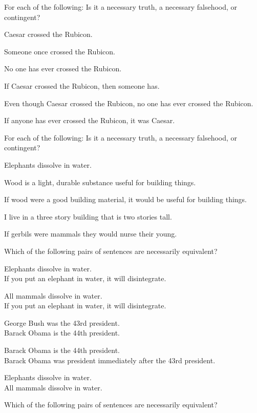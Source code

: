 \begin{practiceproblems}
\problempart
\label{pr.EnglishTautology2}
For each of the following: Is it a necessary truth, a necessary falsehood, or contingent?
\begin{earg}
\item Caesar crossed the Rubicon.
\item Someone once crossed the Rubicon.
\item No one has ever crossed the Rubicon.
\item If Caesar crossed the Rubicon, then someone has.
\item Even though Caesar crossed the Rubicon, no one has ever crossed the Rubicon.
\item If anyone has ever crossed the Rubicon, it was Caesar.
\end{earg}

\problempart
For each of the following: Is it a necessary truth, a necessary falsehood, or contingent?
\begin{earg}
\item Elephants dissolve in water.
\item Wood is a light, durable substance useful for building things.
\item If wood were a good building material, it would be useful for building things.
\item I live in a three story building that is two stories tall.
\item If gerbils were mammals they would nurse their young.
\end{earg}

\problempart Which of the following pairs of sentences are necessarily  equivalent?

\begin{earg}
\item Elephants dissolve in water.	\\
	If you put an elephant in water, it will disintegrate.
\item All mammals dissolve in water.\\
	If you put an elephant in water, it will disintegrate.
\item George Bush was the 43rd president. \\
	 Barack Obama is the 44th president.
\item Barack Obama is the 44th president. \\
	  Barack Obama was president immediately after the 43rd president.
\item Elephants dissolve in water. 	\\
	All mammals dissolve in water.
\end{earg}
\problempart Which of the following pairs of sentences are necessarily equivalent?


\end{practiceproblems}
